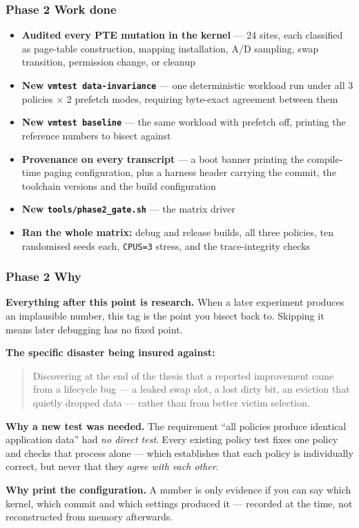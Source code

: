 \documentclass[10pt,aspectratio=169]{beamer}
\newcommand{\phasehead}[2]{%
  \frametitle{#1 \quad\small\normalfont\textcolor{white!75!accent}{#2}}}
\begin{document}
\begin{frame}
  \phasehead{Phase 2}{Work done}
  \small
  \begin{itemize}
    \item \textbf{Audited every PTE mutation in the kernel} --- 24 sites, each
          classified as page-table construction, mapping installation, A/D
          sampling, swap transition, permission change, or cleanup
    \item \textbf{New \texttt{vmtest data-invariance}} --- one deterministic
          workload run under all 3 policies $\times$ 2 prefetch modes,
          requiring byte-exact agreement between them
    \item \textbf{New \texttt{vmtest baseline}} --- the same workload with
          prefetch off, printing the reference numbers to bisect against
    \item \textbf{Provenance on every transcript} --- a boot banner printing the
          compile-time paging configuration, plus a harness header carrying the
          commit, the toolchain versions and the build configuration
    \item \textbf{New \texttt{tools/phase2\_gate.sh}} --- the matrix driver
    \item \textbf{Ran the whole matrix:} debug and release builds, all three
          policies, ten randomised seeds each, \texttt{CPUS=3} stress, and the
          trace-integrity checks
  \end{itemize}
\end{frame}

\begin{frame}
  \phasehead{Phase 2}{Why}
  \small
  \textbf{Everything after this point is research.} When a later experiment
  produces an implausible number, this tag is the point you bisect back to.
  Skipping it means later debugging has no fixed point.

  \medskip
  \textbf{The specific disaster being insured against:}
  \begin{quote}
    Discovering at the end of the thesis that a reported improvement came from
    a lifecycle bug --- a leaked swap slot, a lost dirty bit, an eviction that
    quietly dropped data --- rather than from better victim selection.
  \end{quote}

  \medskip
  \textbf{Why a new test was needed.} The requirement ``all policies produce
  identical application data'' had \emph{no direct test}. Every existing policy
  test fixes one policy and checks that process alone --- which establishes
  that each policy is individually correct, but never that they \emph{agree
  with each other}.

  \medskip
  \textbf{Why print the configuration.} A number is only evidence if you can
  say which kernel, which commit and which settings produced it --- recorded at
  the time, not reconstructed from memory afterwards.
\end{frame}
\end{document}

